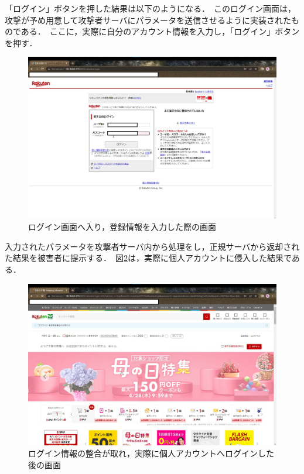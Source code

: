 \documentclass[dvipdfmx]{jsarticle}
\begin{document}
                    「ログイン」ボタンを押した結果は以下のようになる．\
                    このログイン画面は，攻撃が予め用意して攻撃者サーバにパラメータを送信させるように実装されたものである．\
                    ここに，実際に自分のアカウント情報を入力し，「ログイン」ボタンを押す．\
                    \begin{figure}[pth]
                        \centering
                        \includegraphics[width=15cm]{img/rakuten/rakuten-04.png}
                        \caption{ログイン画面へ入り，登録情報を入力した際の画面}
                        \label{rakuten-04}
                    \end{figure}
                    入力されたパラメータを攻撃者サーバ内から処理をし，正規サーバから返却された結果を被害者に提示する．\
                    図\ref{rakuten-05}は，実際に個人アカウントに侵入した結果である．\
                    \begin{figure}[pth]
                        \centering
                        \includegraphics[width=15cm]{img/rakuten/rakuten-05.png}
                        \caption{ログイン情報の整合が取れ，実際に個人アカウントへログインした後の画面}
                        \label{rakuten-05}
                    \end{figure}
                    \clearpage
\end{document}

